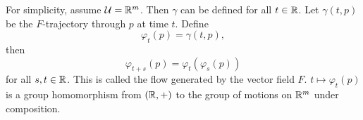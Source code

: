 For simplicity, assume $\mathcal U = {\mathbb R}^m$. Then $\gamma$ can be defined for all $t \in {\mathbb R}$. Let $\gamma(t, p)$ be the $F$-trajectory through $p$ at time $t$. Define
\[
\varphi_t(p) = \gamma(t, p),
\]
then
\[
\varphi_{t+s}(p) = \varphi_t(\varphi_s(p))
\]
for all $s, t \in {\mathbb R}$. This is called the flow generated by the vector field $F$. $t\mapsto \varphi_t(p)$ is a group homomorphism from $({\mathbb R}, +)$ to the group of motions on ${\mathbb R}^m$ under composition.